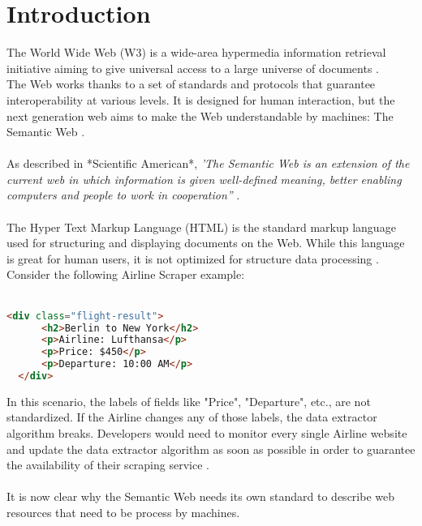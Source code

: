 \chapter{Introduction\label{cha:chapter1}}

The World Wide Web (W3) is a wide-area hypermedia information retrieval initiative aiming to give universal access to a large universe of documents \cite{www}.
\\
The Web works thanks to a set of standards and protocols that guarantee interoperability at various levels. 
It is designed for human interaction, but the next generation web aims to make the Web understandable by machines: The Semantic Web \cite{sematicWeb}.
\\
\\
As described in *Scientific American*, 
\textit{'The Semantic Web is an extension of the current web in which information is given well-defined meaning, better enabling computers and people to work in cooperation''} \cite{bernerslee2001semantic}.
\\
\\
The Hyper Text Markup Language (HTML) is the standard markup language used for structuring and displaying documents on the Web.
While this language is great for human users, it is not optimized for structure data processing \cite{herman2003semanticweb}. 
\\
Consider the following Airline Scraper example:
\\
\\
\begin{lstlisting}[language=HTML, caption={Example of HTML flight data from an Airline company}, label={lst:html-example}, frame=single]
  <div class="flight-result">
      <h2>Berlin to New York</h2>
      <p>Airline: Lufthansa</p>
      <p>Price: $450</p>
      <p>Departure: 10:00 AM</p>
  </div>
  \end{lstlisting}
In this scenario, the labels of fields like "Price", "Departure", etc., are not standardized. If the Airline changes any of those labels, the data extractor algorithm breaks. 
Developers would need to monitor every single Airline website and update the data extractor algorithm as soon as possible in order to guarantee the availability of their scraping service \cite{herman2003semanticweb}.
\\
\\
It is now clear why the Semantic Web needs its own standard to describe web resources that need to be process by machines.
\\
